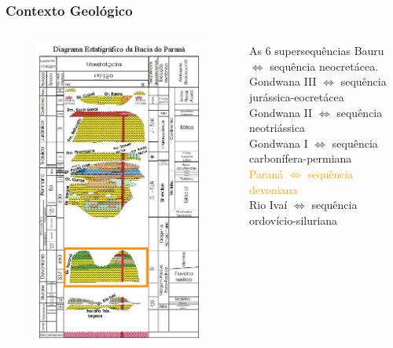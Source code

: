\documentclass[aspectratio=10]{beamer} %
\begin{document}
\begin{frame}
\frametitle{Contexto Geológico}
\begin{columns}
\begin{column}{0.4\textwidth}
\begin{figure}
\includegraphics[scale=0.36]{Imagens/diagramaparana.png}
\end{figure}
\end{column}
\begin{column}{0.75\textwidth}
\begin{block}{As $6$ supersequências}
Bauru $\Longleftrightarrow$  sequência neocretácea.\\
Gondwana III $\Longleftrightarrow$ sequência jurássica-eocretácea\\
Gondwana II $\Longleftrightarrow$ sequência neotriássica \\
Gondwana I $\Longleftrightarrow$ sequência carbonífera-permiana\\ 
\textcolor{orange}{Paraná $\Longleftrightarrow$ sequência devoniana}\\
Rio Ivaí $\Longleftrightarrow$ sequência ordovício-siluriana\\
\cite{Vail_1977,assine_1994,milani_orogenias_1998}
\end{block}
\end{column}
\end{columns}
\end{frame}
\end{document}
